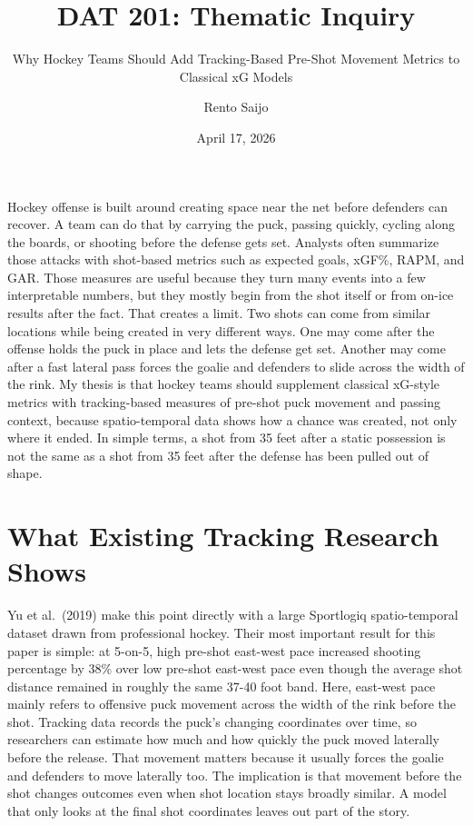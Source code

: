 \documentclass[
  10pt,
]{extarticle}
\title{DAT 201: Thematic Inquiry}
\subtitle{Why Hockey Teams Should Add Tracking-Based Pre-Shot Movement Metrics to Classical xG Models}
\author{Rento Saijo}
\date{April 17, 2026}
\makeatletter
\newcommand{\@subtitle}{}
\renewcommand{\maketitle}{
  \begin{center}
    {\Large \textsc{\@title} \par}
    \vspace{0.35em}
    {\Large \bfseries \@subtitle \par}
    \vspace{0.5em}
    {\normalsize \@author \par}
    {\normalsize \@date \par}
  \end{center}
  \vspace{0.8em}
}
\makeatother
\begin{document}
\maketitle

Hockey offense is built around creating space near the net before defenders can recover. A team can do that by carrying the puck, passing quickly, cycling along the boards, or shooting before the defense gets set. Analysts often summarize those attacks with shot-based metrics such as expected goals, xGF\%, RAPM, and GAR. Those measures are useful because they turn many events into a few interpretable numbers, but they mostly begin from the shot itself or from on-ice results after the fact. That creates a limit. Two shots can come from similar locations while being created in very different ways. One may come after the offense holds the puck in place and lets the defense get set. Another may come after a fast lateral pass forces the goalie and defenders to slide across the width of the rink. My thesis is that hockey teams should supplement classical xG-style metrics with tracking-based measures of pre-shot puck movement and passing context, because spatio-temporal data shows how a chance was created, not only where it ended. In simple terms, a shot from 35 feet after a static possession is not the same as a shot from 35 feet after the defense has been pulled out of shape.

\section{What Existing Tracking Research Shows}\label{what-existing-tracking-research-shows}

Yu et al.~(2019) make this point directly with a large Sportlogiq spatio-temporal dataset drawn from professional hockey. Their most important result for this paper is simple: at 5-on-5, high pre-shot east-west pace increased shooting percentage by 38\% over low pre-shot east-west pace even though the average shot distance remained in roughly the same 37-40 foot band. Here, east-west pace mainly refers to offensive puck movement across the width of the rink before the shot. Tracking data records the puck's changing coordinates over time, so researchers can estimate how much and how quickly the puck moved laterally before the release. That movement matters because it usually forces the goalie and defenders to move laterally too. The implication is that movement before the shot changes outcomes even when shot location stays broadly similar. A model that only looks at the final shot coordinates leaves out part of the story.
\end{document}
